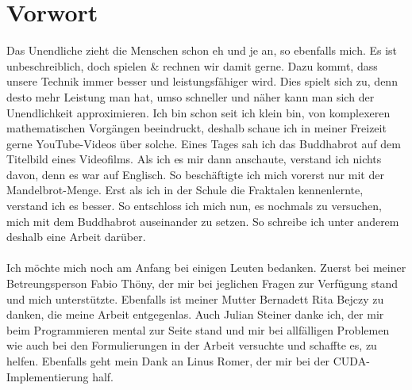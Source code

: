 \section*{Vorwort}
Das Unendliche zieht die Menschen schon eh und je an, so ebenfalls mich. Es ist unbeschreiblich, doch spielen \& rechnen wir damit gerne. Dazu kommt, dass unsere Technik immer besser und leistungsfähiger wird. Dies spielt sich zu, denn desto mehr Leistung man hat, umso schneller und näher kann man sich der Unendlichkeit approximieren. Ich bin schon seit ich klein bin, von komplexeren mathematischen Vorgängen beeindruckt, deshalb schaue ich in meiner Freizeit gerne YouTube-Videos über solche. Eines Tages sah ich das Buddhabrot auf dem Titelbild eines Videofilms. Als ich es mir dann anschaute, verstand ich nichts davon, denn es war auf Englisch. So beschäftigte ich mich vorerst nur mit der Mandelbrot-Menge. Erst als ich in der Schule die Fraktalen kennenlernte, verstand ich es besser. So entschloss ich mich nun, es nochmals zu versuchen, mich mit dem Buddhabrot auseinander zu setzen. So schreibe ich unter anderem deshalb eine Arbeit darüber.\\
\\
Ich möchte mich noch am Anfang bei einigen Leuten bedanken. Zuerst bei meiner Betreungsperson Fabio Thöny, der mir bei jeglichen Fragen zur Verfügung stand und mich unterstützte. Ebenfalls ist meiner Mutter Bernadett Rita Bejczy zu danken, die meine Arbeit entgegenlas. Auch Julian Steiner danke ich, der mir beim Programmieren mental zur Seite stand und mir bei allfälligen Problemen wie auch bei den Formulierungen in der Arbeit versuchte und schaffte es, zu helfen. Ebenfalls geht mein Dank an Linus Romer, der mir bei der CUDA-Implementierung half.